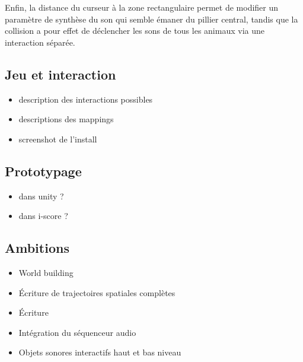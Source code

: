 \documentclass[french]{article}
\begin{document}
    Enfin, la distance du curseur à la zone rectangulaire permet de modifier un paramètre de synthèse du son qui semble émaner du pillier central, tandis que la collision a pour effet de déclencher les sons de tous les animaux via une interaction séparée.
    
   
    
    \subsection*{Jeu et interaction}
    \begin{itemize}
    \item description des interactions possibles
    \item descriptions des mappings
    \item screenshot de l'install
    \end{itemize}
    
    \subsection*{Prototypage}
    \begin{itemize}
    \item dans unity ? 
    
    \item dans i-score ? 
    \end{itemize}
    
    \subsection*{Ambitions}
    \begin{itemize}
    \item World building
    \item Écriture de trajectoires spatiales complètes
    \item Écriture 
    \item Intégration du séquenceur audio
    \item Objets sonores interactifs haut et bas niveau
    \end{itemize}
\end{document}
